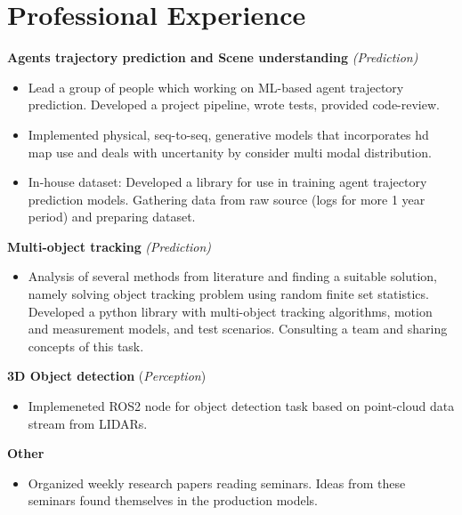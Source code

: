 \section*{\sectionformat Professional Experience}
% 

\textbf{Agents trajectory prediction and Scene understanding} \textit{(Prediction)}
\begin{itemize}
    \item Lead a group of people which working on ML-based agent trajectory prediction. Developed a project pipeline, wrote tests, provided code-review.
    \item Implemented physical, seq-to-seq, generative models that incorporates hd map use and deals with uncertanity by consider multi modal distribution.
    \item In-house dataset: Developed a library for use in training agent trajectory prediction models. Gathering data from raw source (logs for more 1 year period) and preparing dataset.
\end{itemize}

\textbf{Multi-object tracking} \textit{(Prediction)}
\begin{itemize}
    \item Analysis of several methods from literature and finding a suitable solution, namely solving object tracking problem using random finite set statistics. Developed a python library with multi-object tracking algorithms, motion and measurement models, and test scenarios. Consulting a team and sharing concepts of this task.
\end{itemize}

\textbf{3D Object detection} (\textit{Perception})
\begin{itemize}
    \item Implemeneted ROS2 node for object detection task based on point-cloud data stream from LIDARs.
\end{itemize}

\textbf{Other}
\begin{itemize}
    \item Organized weekly research papers reading seminars. Ideas from these seminars found themselves in the production models.
\end{itemize}


